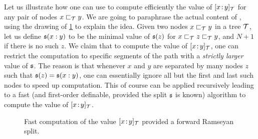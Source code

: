 \AP Let us illustrate how one can use  to compute
efficiently the value of $\tlbl{\t}{x}{y}$ for any pair of nodes $x \treelt[\t]
y$. We are going to paraphrase the actual content of \cite[Lemma 3]{COLC07},
using the drawing of \cref{fast-computation:fig}
to
explain the idea. Given two nodes $x \treelt[\t] y$ in a tree $\t$, let us
define $\mathfrak{s}(x:y)$ to be the minimal value of $\mathfrak{s}(z)$ for $x \treelt[\t] z
\treelt[\t] y$, and $N+1$ if there is no such $z$. We claim that to compute the
value of $\tlbl{\t}{x}{y}$, one can restrict the computation to specific
segments of the path with a \emph{strictly larger} value of $\mathfrak{s}$. The reason
is that whenever $x$ and $y$ are separated by many nodes $z$ such that $\mathfrak{s}(z)
= \mathfrak{s}(x:y)$, one can essentially ignore all but the first and last such nodes
to speed up computation. This of course can be applied recursively leading to a
fast (and first-order definable, provided the split $\mathfrak{s}$ is known) algorithm
to compute the value of $\tlbl{\t}{x}{y}$.

\begin{figure}
    \centering
    \caption{Fast computation of the value $\tlbl{\t}{x}{y}$
        provided a forward Ramseyan split.}
    \label{fast-computation:fig}
\end{figure}


